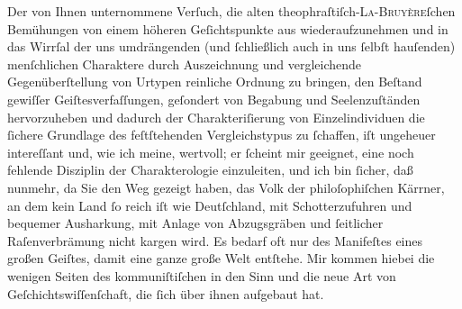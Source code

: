 \pstart
           Der von Ihnen unternommene Verſuch, die alten theophraſtiſch-\textsc{La-Bruyère}ſchen Bemühungen von einem höheren Geſichtspunkte aus wiederaufzunehmen und in
               das Wirrſal der uns umdrängenden (und{ }ſchließlich auch in uns{ }ſelbſt hauſenden)
               menſchlichen Charaktere durch Auszeichnung und vergleichende Gegenüberſtellung von
               Urtypen reinliche Ordnung zu bringen, den Beſtand gewiſſer Geiſtesverfaſſungen,
               geſondert von Begabung und Seelenzuſtänden hervorzuheben und dadurch der
               Charakteriſierung von Einzelindividuen die{ }ſichere Grundlage des feſtſtehenden
               Vergleichstypus {\pb}zu{ }ſchaffen, iſt
               ungeheuer intereſſant und, wie ich meine, wertvoll; er{ }ſcheint mir geeignet, eine
               noch fehlende Disziplin der Charakterologie einzuleiten, und ich bin{ }ſicher, daß
               nunmehr, da Sie den Weg gezeigt haben, das Volk der philoſophiſchen Kärrner, an dem
               kein Land{ }ſo reich iſt wie Deutſchland, mit
               Schotterzufuhren und bequemer Ausharkung, mit Anlage von Abzugsgräben und{ }ſeitlicher
               Raſenverbrämung nicht kargen wird. Es bedarf oft nur des Manifeſtes \introOben{}\label{T_L02483-1v}\label{T_L02483-1}\introOben{} eines großen Geiſtes, damit eine ganze große Welt entſtehe. Mir kommen hiebei
               die wenigen Seiten des kommuniſtiſchen in den Sinn und  die neue Art von Geſchichtswiſſenſchaft, die{ }ſich über ihnen aufgebaut
               hat.\pend
           
